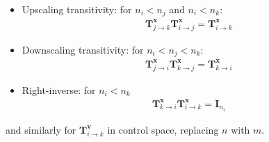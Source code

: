 \documentclass[npg, manuscript]{copernicus}
\begin{document}
\begin{itemize}
\item Upscaling transitivity: for $n_i < n_j$ and $n_i < n_k$:
\begin{align}
\mathbf{T}^\mathbf{x}_{j \rightarrow k} \mathbf{T}^\mathbf{x}_{i \rightarrow j} = \mathbf{T}^\mathbf{x}_{i \rightarrow k}
\end{align}
\item Downscaling transitivity: for $n_i < n_j < n_k$:
\begin{align}
\mathbf{T}^\mathbf{x}_{j \rightarrow i} \mathbf{T}^\mathbf{x}_{k \rightarrow j} = \mathbf{T}^\mathbf{x}_{k \rightarrow i}
\end{align}
\item Right-inverse: for $n_i < n_k$
\begin{align}
\mathbf{T}^\mathbf{x}_{k \rightarrow i} \mathbf{T}^\mathbf{x}_{i \rightarrow k} = \mathbf{I}_{n_i}
\end{align}
\end{itemize}
and similarly for $\mathbf{T}^\mathbf{v}_{i \rightarrow k}$ in control space, replacing $n$ with $m$.
\end{document}
